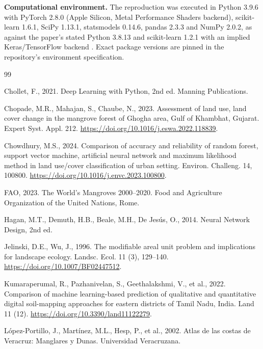\documentclass[10pt,twocolumn,a4paper]{article}
\begin{document}
\textbf{Computational environment.} The reproduction was executed in Python 3.9.6 with PyTorch
2.8.0 (Apple Silicon, Metal Performance Shaders backend), scikit-learn 1.6.1, SciPy 1.13.1,
statsmodels 0.14.6, pandas 2.3.3 and NumPy 2.0.2, as against the paper's stated Python 3.8.13 and
scikit-learn 1.2.1 with an implied Keras/TensorFlow backend \citep{chollet2021}. Exact package
versions are pinned in the repository's environment specification.

\begin{thebibliography}{99}
\footnotesize

Chollet, F., 2021. Deep Learning with Python, 2nd ed. Manning Publications.

Chopade, M.R., Mahajan, S., Chaube, N., 2023. Assessment of land use, land cover change in the
mangrove forest of Ghogha area, Gulf of Khambhat, Gujarat. Expert Syst. Appl. 212.
\url{https://doi.org/10.1016/j.eswa.2022.118839}.

Chowdhury, M.S., 2024. Comparison of accuracy and reliability of random forest, support vector
machine, artificial neural network and maximum likelihood method in land use/cover classification
of urban setting. Environ. Challeng. 14, 100800.
\url{https://doi.org/10.1016/j.envc.2023.100800}.

FAO, 2023. The World's Mangroves 2000--2020. Food and Agriculture Organization of the United
Nations, Rome.

Hagan, M.T., Demuth, H.B., Beale, M.H., De Jes\'us, O., 2014. Neural Network Design, 2nd ed.

Jelinski, D.E., Wu, J., 1996. The modifiable areal unit problem and implications for landscape
ecology. Landsc. Ecol. 11 (3), 129--140. \url{https://doi.org/10.1007/BF02447512}.

Kumaraperumal, R., Pazhanivelan, S., Geethalakshmi, V., et al., 2022. Comparison of machine
learning-based prediction of qualitative and quantitative digital soil-mapping approaches for
eastern districts of Tamil Nadu, India. Land 11 (12).
\url{https://doi.org/10.3390/land11122279}.

L\'opez-Portillo, J., Mart\'inez, M.L., Hesp, P., et al., 2002. Atlas de las costas de Veracruz:
Manglares y Dunas. Universidad Veracruzana.


\end{thebibliography}
\end{document}
